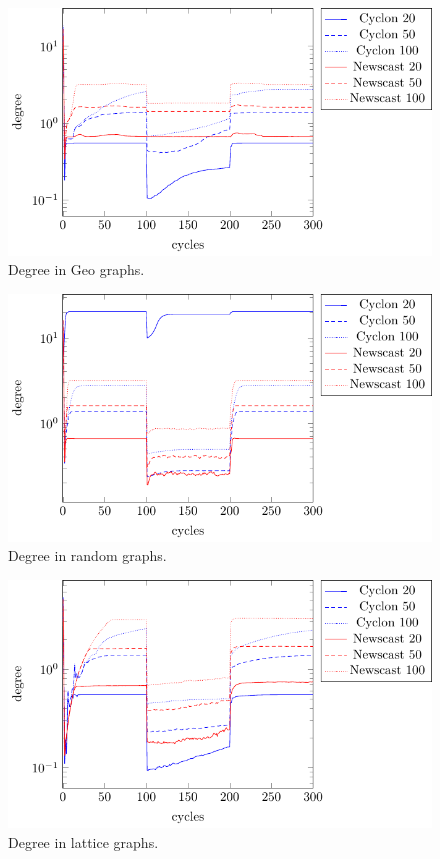 \documentclass[a4paper]{ifacconf}
\begin{document}
\begin{figure}[p]
    \centering
    \includegraphics[width=.9\linewidth]{"figures/degree/degree geo"}
    \caption{Degree in Geo graphs.}
    \label{fig:degree-geo}
\end{figure}
\begin{figure}[p]
    \centering
    \includegraphics[width=.9\linewidth]{"figures/degree/degree random"}
    \caption{Degree in random graphs.}
    \label{fig:degree-random}
\end{figure}
\begin{figure}[p]
    \centering
    \includegraphics[width=.9\linewidth]{"figures/degree/degree lattice"}
    \caption{Degree in lattice graphs.}
    \label{fig:degree-lattice}
\end{figure}
\end{document}
